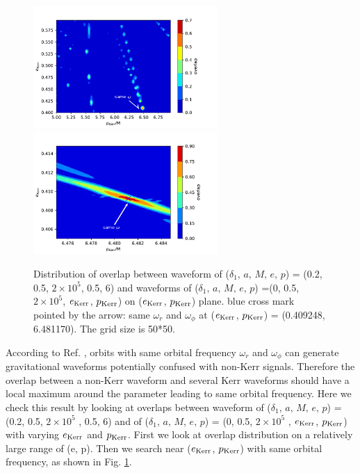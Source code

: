 \documentclass{article}
\begin{document}
\begin{figure}[htb]
	\centering
	\includegraphics[width=7cm]{OLdist.pdf}
	\includegraphics[width=7cm]{OLdist2.pdf}
	
	\caption{Distribution of overlap between waveform of ($\delta_1,\, a,\, M,\, e,\, p$) = (0.2, 0.5, $2 \times 10^5 $, 0.5, 6) and waveforms of ($\delta_1,\, a,\, M,\, e,\, p$) =(0, 0.5, $2 \times 10^5 $, $e_{\rm{Kerr}}$, $p_{\rm{Kerr}}$) on ($e_{\rm{Kerr}}$, $p_{\rm{Kerr}}$) plane. blue cross mark pointed by the arrow: same $\omega_r$ and $\omega_\phi$ at ($e_{\rm{Kerr}}$, $p_{\rm{Kerr}}$) = (0.409248, 6.481170).  The grid size is 50*50.}
	\label{overlapdist}
\end{figure}

According to Ref. \cite{sameOmg}, orbits with same orbital frequency $\omega_r$ and $\omega_\phi$ can generate gravitational waveforms potentially confused with non-Kerr signals. Therefore the overlap between a non-Kerr waveform and several Kerr waveforms should have a local maximum around the parameter leading to same orbital frequency. Here we check this result by looking at overlaps between waveform of ($\delta_1,\, a,\, M,\, e,\, p$) = (0.2, 0.5, $2 \times 10^5 $ , 0.5, 6) and of ($\delta_1,\, a,\, M,\, e,\, p$) = (0, 0.5, $2 \times 10^5 $ , $e_{\rm{Kerr}}$, $p_{\rm{Kerr}}$) with varying $e_{\rm{Kerr}}$ and $p_{\rm{Kerr}}$. First we look at overlap distribution on a relatively large range of (e, p). Then we search near ($e_{\rm{Kerr}}$, $p_{\rm{Kerr}}$) with same orbital frequency, as shown in Fig. \ref{overlapdist}. 
\end{document}
